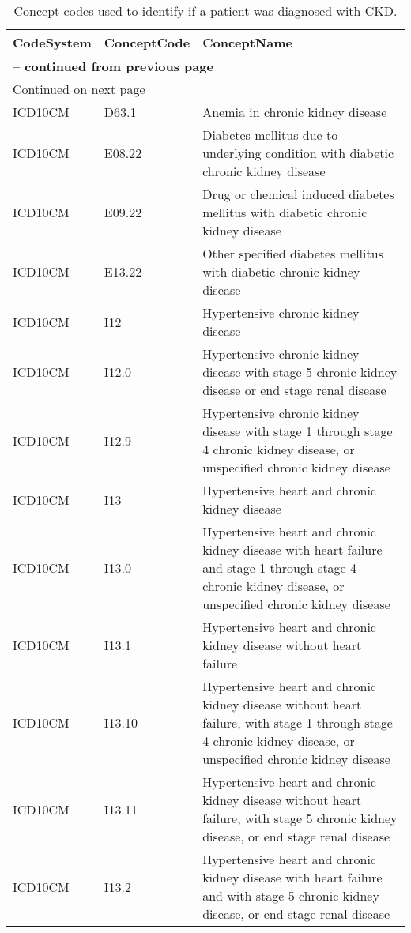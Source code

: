 \begin{longtable}{p{}p{}p{}}
\caption{Concept codes used to identify if a patient was diagnosed with CKD.} \\ 
 CodeSystem & ConceptCode & ConceptName \\ 
  \hline 
\endfirsthead 
\multicolumn{3}{p{\textwidth}}{{ \bfseries \tablename \thetable{} -- continued from previous page}} \ 
\hline CodeSystem & ConceptCode & ConceptName \\ \hline 
\endhead 
\hline \multicolumn{3}{p{\textwidth}}{{Continued on next page}} \\ \hline 
\endfoot 
\hline 
\endlastfoot 
 \hline
ICD10CM & D63.1 & Anemia in chronic kidney disease \\ 
  ICD10CM & E08.22 & Diabetes mellitus due to underlying condition with diabetic chronic kidney disease \\ 
  ICD10CM & E09.22 & Drug or chemical induced diabetes mellitus with diabetic chronic kidney disease \\ 
  ICD10CM & E13.22 & Other specified diabetes mellitus with diabetic chronic kidney disease \\ 
  ICD10CM & I12 & Hypertensive chronic kidney disease \\ 
  ICD10CM & I12.0 & Hypertensive chronic kidney disease with stage 5 chronic kidney disease or end stage renal disease \\ 
  ICD10CM & I12.9 & Hypertensive chronic kidney disease with stage 1 through stage 4 chronic kidney disease, or unspecified chronic kidney disease \\ 
  ICD10CM & I13 & Hypertensive heart and chronic kidney disease \\ 
  ICD10CM & I13.0 & Hypertensive heart and chronic kidney disease with heart failure and stage 1 through stage 4 chronic kidney disease, or unspecified chronic kidney disease \\ 
  ICD10CM & I13.1 & Hypertensive heart and chronic kidney disease without heart failure \\ 
  ICD10CM & I13.10 & Hypertensive heart and chronic kidney disease without heart failure, with stage 1 through stage 4 chronic kidney disease, or unspecified chronic kidney disease \\ 
  ICD10CM & I13.11 & Hypertensive heart and chronic kidney disease without heart failure, with stage 5 chronic kidney disease, or end stage renal disease \\ 
  ICD10CM & I13.2 & Hypertensive heart and chronic kidney disease with heart failure and with stage 5 chronic kidney disease, or end stage renal disease \\ 

\end{longtable}
